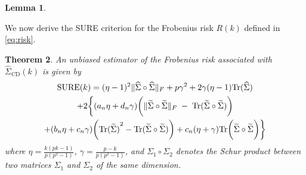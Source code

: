 \documentclass[11pt,oneside]{amsart}
\def\CD{{\mathrm{\scriptscriptstyle CD}}}
\newtheorem{theorem}{Theorem}[section]
\newtheorem{lemma}[theorem]{Lemma}
\begin{document}
\begin{lemma}
%
\end{lemma}
We now derive the SURE criterion for the Frobenius risk $R(k)$ defined in \eqref{eq:risk}.
\begin{theorem} \label{surethm}
An unbiased estimator of the Frobenius risk associated with $\widehat{\Sigma}_{\CD}(k)$ is given by 
\small
\begin{multline*} \label{eq17}
\mbox{SURE}(k) = (\eta - 1)^{2}\|{\widehat{\Sigma}} \circ {\widehat{\Sigma}} \|_{F} + p{\gamma^2} + 2{\gamma}(\eta - 1){\mbox{Tr}}({\widehat{\Sigma}}) \\
+ 2\bigg\{(a_n\eta + d_n\gamma)\bigg(\|{\widetilde{\Sigma}}\circ{\widetilde{\Sigma}}\|_{F} \;- \;\mbox{Tr}({\widetilde{\Sigma}}\circ{\widetilde{\Sigma}})\bigg) \notag \\ +  (b_n\eta +  c_n\gamma)\bigg({{\mbox{Tr}}({\widetilde{\Sigma}})}^{2} - {\mbox{Tr}}({\widetilde{\Sigma}} \circ {\widetilde{\Sigma}})\bigg) + c_n(\eta + \gamma){\mbox{Tr}}\bigg({\widetilde{\Sigma}} \circ {\widetilde{\Sigma}}\bigg)\bigg\}
\end{multline*}
\normalsize
where $\eta = \frac{k(pk - 1)}{p(p^2 - 1)}$, $\gamma = \frac{p - k}{p(p^2 - 1)}$, and $\Sigma_{1} \circ \Sigma_{2}$ denotes the Schur product between two matrices $\Sigma_1$ and $\Sigma_2$ of the same dimension. 
\end{theorem}
\end{document}
